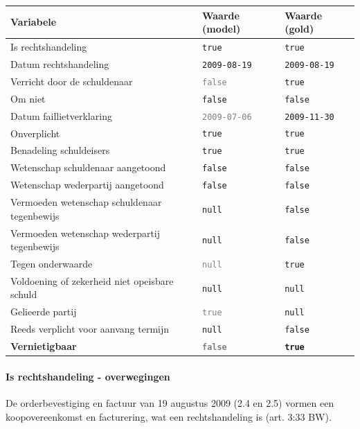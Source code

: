 \documentclass[
  dutch,
  a4paper,
]{article}
\begin{document}
\begin{center}
\small
\begin{tabular}{@{}p{7.4cm}p{2.6cm}p{2.6cm}@{}}
\toprule
Variabele & Waarde (model) & Waarde (gold) \\
\midrule
Is rechtshandeling & \texttt{true} & \texttt{true} \\
Datum rechtshandeling & \texttt{2009-08-19} & \texttt{2009-08-19} \\
Verricht door de schuldenaar & \textcolor{gray}{\texttt{false}} & \texttt{true} \\
Om niet & \texttt{false} & \texttt{false} \\
Datum faillietverklaring & \textcolor{gray}{\texttt{2009-07-06}} & \texttt{2009-11-30} \\
Onverplicht & \texttt{true} & \texttt{true} \\
Benadeling schuldeisers & \texttt{true} & \texttt{true} \\
Wetenschap schuldenaar aangetoond & \texttt{false} & \texttt{false} \\
Wetenschap wederpartij aangetoond & \texttt{false} & \texttt{false} \\
Vermoeden wetenschap schuldenaar tegenbewijs & \texttt{null} & \texttt{false} \\
Vermoeden wetenschap wederpartij tegenbewijs & \texttt{null} & \texttt{false} \\
Tegen onderwaarde & \textcolor{gray}{\texttt{null}} & \texttt{true} \\
Voldoening of zekerheid niet opeisbare schuld & \texttt{null} & \texttt{null} \\
Gelieerde partij & \textcolor{gray}{\texttt{true}} & \texttt{null} \\
Reeds verplicht voor aanvang termijn & \texttt{null} & \texttt{false} \\
\textbf{Vernietigbaar} & \textbf{\textcolor{gray}{\texttt{false}}} & \textbf{\texttt{true}} \\
\bottomrule
\end{tabular}
\end{center}

\paragraph{Is rechtshandeling - overwegingen}\label{is-rechtshandeling---overwegingen-66}

De orderbevestiging en factuur van 19 augustus 2009 (2.4 en 2.5) vormen een koopovereenkomst en facturering, wat een rechtshandeling is (art. 3:33 BW).
\end{document}

